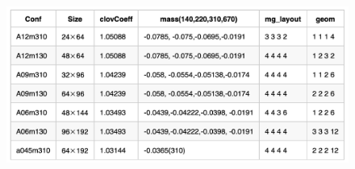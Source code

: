 \documentclass{article}
\begin{document}
\begin{figure}[h]
  \centering
  \includegraphics[scale=0.5]{configuration_set.png} 	
\end{figure} 
\end{document}

